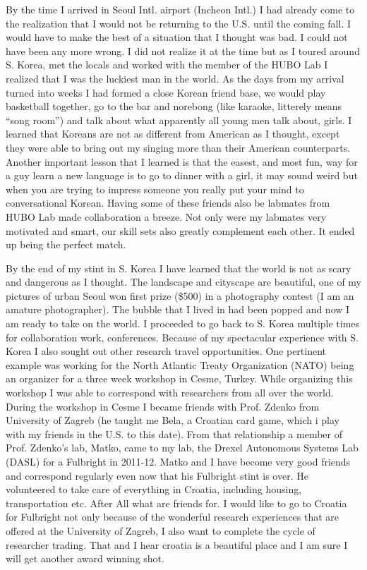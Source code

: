 \documentclass[12pt]{article}
\begin{document}
	By the time I arrived in Seoul Intl. airport (Incheon Intl.) I had already come to the realization that I would not be returning to the U.S. until the coming fall.  I would have to make the best of a situation that I thought was bad.  I could not have been any more wrong.  I did not realize it at the time but as I toured around S. Korea, met the locals and worked with the member of the HUBO Lab I realized that I was the luckiest man in the world.  As the days from my arrival turned into weeks I had formed a close Korean friend base, we would play basketball together, go to the bar and norebong (like karaoke, litterely means “song room”) and talk about what apparently all young men talk about, girls.  I learned that Koreans are not as different from American as I thought, except they were able to bring out my singing more than their American counterparts.  Another important lesson that I learned is that the easest, and most fun, way for a guy learn a new language is to go to dinner with a girl, it may sound weird but when you are trying to impress someone you really put your mind to conversational Korean.  Having some of these friends also be labmates from HUBO Lab made collaboration a breeze.  Not only were my labmates very motivated and smart, our skill sets also greatly complement each other.  It ended up being the perfect match.  

	By the end of my stint in S. Korea I have learned that the world is not as scary and dangerous as I thought.  The landscape and cityscape are beautiful, one of my pictures of urban Seoul won first prize (\$500) in a photography contest (I am an amature photographer).  The bubble that I lived in had been popped and now I am ready to take on the world.  I proceeded to go back to S. Korea multiple times for collaboration work, conferences.  Because of my spectacular experience with S. Korea I also sought out other research travel opportunities.  One pertinent example was working for the North Atlantic Treaty Organization (NATO) being an organizer for a three week workshop in Cesme, Turkey.  While organizing this workshop I was able to correspond with researchers from all over the world.  During the workshop in Cesme I became friends with Prof. Zdenko from University of Zagreb (he taught me Bela, a Croatian card game, which i play with my friends in the U.S. to this date).  From that relationship a member of Prof. Zdenko’s lab, Matko, came to my lab, the Drexel Autonomous Systems Lab (DASL) for a Fulbright in 2011-12.  Matko and I have become very good friends and correspond regularly even now that his Fulbright stint is over.  He volunteered to take care of everything in Croatia, including housing, transportation etc.  After All what are friends for.  I would like to go to Croatia for Fulbright not only because of the wonderful research experiences that are offered at the University of Zagreb, I also want to complete the cycle of researcher trading.  That and I hear croatia is a beautiful place and I am sure I will get another award winning shot.
\end{document}
